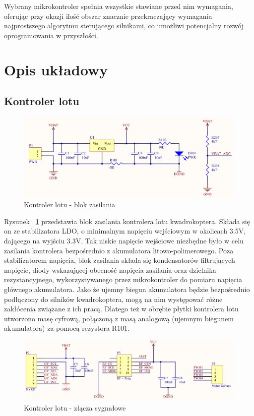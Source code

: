 Wybrany mikrokontroler spełnia wszystkie stawiane przed nim wymagania, oferując przy okazji ilość obszar znacznie przekraczający wymagania najprostszego algorytmu sterującego silnikami, co umożliwi potencjalny rozwój oprogramowania w przyszłości.

\section{Opis układowy}

\subsection{Kontroler lotu}

\begin{figure}[H]
	\centering
	\includegraphics[scale=0.4]{Pictures/QuadroController_PWR_C.png}
		\caption[Kontroler lotu - blok zasilania]{Kontroler lotu - blok zasilania}
	\label{fig:QuadroControllerPWR}
\end{figure}

Rysunek ~\ref{fig:QuadroControllerPWR} przedstawia blok zasilania kontrolera lotu kwadrokoptera. Składa się on ze stabilizatora LDO, o minimalnym napięciu wejściowym w okolicach 3.5V, dającego na wyjściu 3.3V. Tak niskie napięcie wejściowe niezbędne było w celu zasilania kontrolera bezpośrednio z akumulatora litowo-polimerowego. Poza stabilizatorem napięcia, blok zasilania składa się kondensatorów filtrujących napięcie, diody wskazującej obecność napięcia zasilania oraz dzielnika rezystancyjnego, wykorzystywanego przez mikrokontroler do pomiaru napięcia głównego akumulatora. Jako że ujemny biegun akumulatora będzie bezpośrednio podłączony do silników kwadrokoptera, mogą na nim występować różne zakłócenia związane z ich pracą. Dlatego też w obrębie płytki kontrolera lotu utworzono masę cyfrową, połączoną z masą analogową (ujemnym biegunem akumulatora) za pomocą rezystora R101.

\begin{figure}[H]
	\centering
	\includegraphics[scale=0.36]{Pictures/QuadroController_Connector_C.png}
		\caption[Kontroler lotu - złącza sygnałowe]{Kontroler lotu - złącza sygnałowe}
	\label{fig:QuadrotorControllerConnectors}
\end{figure}

